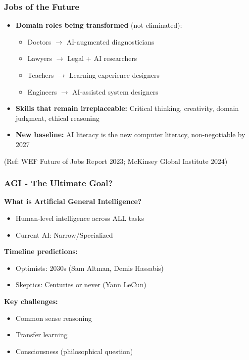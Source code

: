 \begin{frame}[fragile]\frametitle{Jobs of the Future}
\begin{itemize}
\item \textbf{Domain roles being transformed} (not eliminated):
	\begin{itemize}
	\item Doctors $\rightarrow$ AI-augmented diagnosticians
	\item Lawyers $\rightarrow$ Legal + AI researchers
	\item Teachers $\rightarrow$ Learning experience designers
	\item Engineers $\rightarrow$ AI-assisted system designers
	\end{itemize}
\item \textbf{Skills that remain irreplaceable:} Critical thinking, creativity, domain judgment, ethical reasoning
\item \textbf{New baseline:} AI literacy is the new computer literacy, non-negotiable by 2027
\end{itemize}
{\tiny (Ref: WEF Future of Jobs Report 2023; McKinsey Global Institute 2024)}
\end{frame}

\begin{frame}[fragile]\frametitle{AGI - The Ultimate Goal?}

\textbf{What is Artificial General Intelligence?}
\begin{itemize}
\item Human-level intelligence across ALL tasks
\item Current AI: Narrow/Specialized
\end{itemize}

\textbf{Timeline predictions:}
\begin{itemize}
\item Optimists: 2030s (Sam Altman, Demis Hassabis)
\item Skeptics: Centuries or never (Yann LeCun)
\end{itemize}

\textbf{Key challenges:}
\begin{itemize}
\item Common sense reasoning
\item Transfer learning
\item Consciousness (philosophical question)
\end{itemize}

\end{frame}



